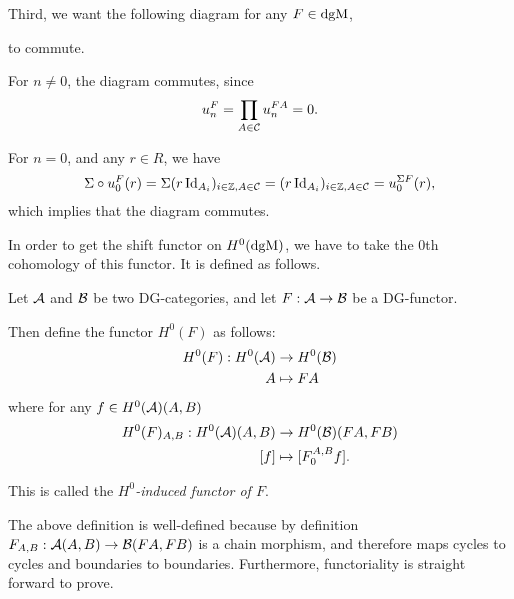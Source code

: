 \begin{remark}
    Third, we want the following diagram for any \( F \in \operatorname{dgM} \),
    \begin{center}
    \end{center}
    to commute.

    For \( n \neq 0 \), the diagram commutes, since 
    \[
        u_n^F = \prod_{A \in {\mathcal{C}}} u_n^{F A} = 0.
    \]

    For \( n = 0 \), and any \( r \in R \), we have
    \[
        \Sigma \circ u_0^F (r) = \Sigma (r \operatorname{Id}_{A_i})_{i \in {\mathbb{Z}}, A \in {\mathcal{C}}} = (r \operatorname{Id}_{A_i})_{i \in {\mathbb{Z}}, A \in {\mathcal{C}}} = u_0^{\Sigma F} (r),
    \]
    which implies that the diagram commutes.
\end{remark}

In order to get the shift functor on \( H^0(\operatorname{dgM}) \), we have to take the \( 0 \)th cohomology of this functor. It is defined as follows.

\begin{definition}
    \label{def:H^0-induced_functor}
    Let \( {\mathcal{A}} \) and \( {\mathcal{B}} \) be two DG-categories, and let \( F: {\mathcal{A}} \to {\mathcal{B}} \) be a DG-functor.

    Then define the functor \( H^0(F) \) as follows:
    \begin{align*}
        H^0(F): H^0({\mathcal{A}}) &\to H^0({\mathcal{B}}) \\
        A &\mapsto F A
    \end{align*}
    where for any \( f \in H^0({\mathcal{A}})(A, B) \)
    \begin{align*}
        H^0(F)_{A, B}: H^0({\mathcal{A}})(A, B) &\to H^0({\mathcal{B}})(F A, F B) \\
        [f] &\mapsto [F_0^{A, B} f].
    \end{align*}

    This is called the \emph{\( H^0 \)-induced functor of \( F \)}.
\end{definition}

The above definition is well-defined because by definition \( F_{A, B}: {\mathcal{A}}(A, B) \to {\mathcal{B}}(F A, F B) \) is a chain morphism, and therefore maps cycles to cycles and boundaries to boundaries. Furthermore, functoriality is straight forward to prove.

